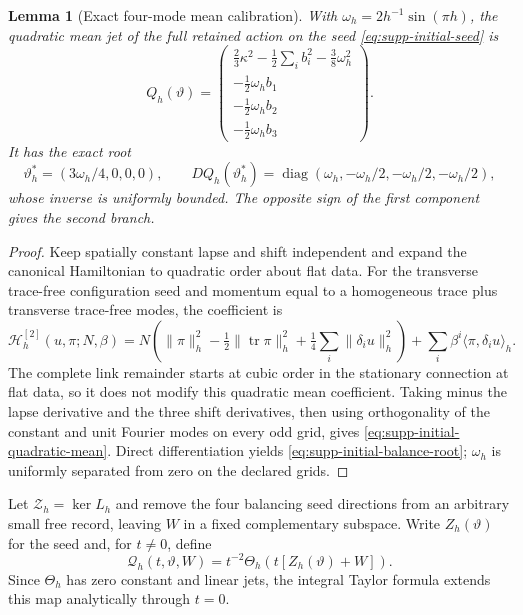 \documentclass[11pt]{article}
\newtheorem{lemma}[lemma]{Lemma}
\theoremstyle{definition}
\theoremstyle{remark}
\newcommand{\tr}{\operatorname{tr}}
\begin{document}
\begin{lemma}[Exact four-mode mean calibration]
\label{lem:supp-initial-balance}
With $\omega_h=2h^{-1}\sin(\pi h)$, the quadratic mean jet of the full
retained action on the seed \eqref{eq:supp-initial-seed} is
\begin{equation}
 Q_h(\vartheta)=
 \begin{pmatrix}
 \frac23\kappa^2-\frac12\sum_i b_i^2-\frac38\omega_h^2\\
 -\frac12\omega_hb_1\\-\frac12\omega_hb_2\\-\frac12\omega_hb_3
 \end{pmatrix}.
 \label{eq:supp-initial-quadratic-mean}
\end{equation}
It has the exact root
\begin{equation}
 \vartheta_h^*=(3\omega_h/4,0,0,0),
 \qquad
 DQ_h(\vartheta_h^*)=
 \operatorname{diag}(\omega_h,-\omega_h/2,-\omega_h/2,-\omega_h/2),
 \label{eq:supp-initial-balance-root}
\end{equation}
whose inverse is uniformly bounded.  The opposite sign of the first component
gives the second branch.
\end{lemma}
\begin{proof}
Keep spatially constant lapse and shift independent and expand the canonical
Hamiltonian to quadratic order about flat data.  For the transverse trace-free
configuration seed and momentum equal to a homogeneous trace plus transverse
trace-free modes, the coefficient is
\[
 \mathscr H_h^{[2]}(u,\pi;N,\beta)=
 N\left(\|\pi\|_h^2-\tfrac12\|\tr\pi\|_h^2
          +\tfrac14\sum_i\|\delta_i u\|_h^2\right)
 +\sum_i\beta^i\langle\pi,\delta_i u\rangle_h.
\]
The complete link remainder starts at cubic order in the stationary connection
at flat data, so it does not modify this quadratic mean coefficient.  Taking
minus the lapse derivative and the three shift derivatives, then using
orthogonality of the constant and unit Fourier modes on every odd grid, gives
\eqref{eq:supp-initial-quadratic-mean}.  Direct differentiation yields
\eqref{eq:supp-initial-balance-root}; $\omega_h$ is uniformly separated from
zero on the declared grids.
\end{proof}

Let $\mathcal Z_h=\ker L_h$ and remove the four balancing seed directions
from an arbitrary small free record, leaving $W$ in a fixed complementary
subspace.  Write $Z_h(\vartheta)$ for the seed and, for $t\ne0$, define
\begin{equation}
 \mathcal Q_h(t,\vartheta,W)=t^{-2}\Theta_h(t[Z_h(\vartheta)+W]).
 \label{eq:supp-initial-normalized-mean}
\end{equation}
Since $\Theta_h$ has zero constant and linear jets, the integral Taylor formula
extends this map analytically through $t=0$.
\end{document}
